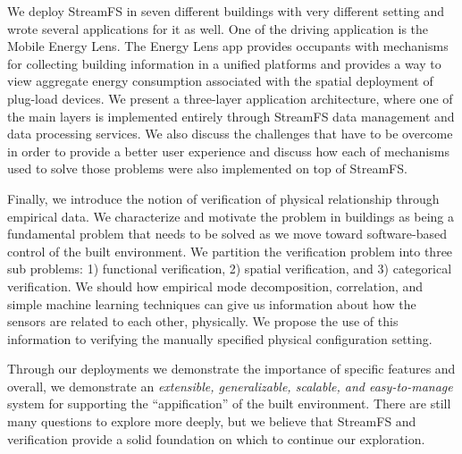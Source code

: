 We deploy StreamFS in seven different buildings with very different setting and wrote several applications for it as well.  One of the driving
application is the Mobile Energy Lens.  The Energy Lens app provides occupants with mechanisms for collecting building information
in a unified platforms and provides a way to view aggregate energy consumption associated with the spatial deployment
of plug-load devices.  We present a three-layer application architecture, where one of the main layers is implemented entirely through
StreamFS data management and data processing services.  We also discuss the challenges that have to be overcome in order to
provide a better user experience and discuss how each of mechanisms used to solve those problems were also implemented on top of StreamFS.

Finally, we introduce the notion of verification of physical relationship through empirical data.  We characterize and motivate the problem
in buildings as being a fundamental problem that needs to be solved as we move toward software-based control of the built environment.
We partition the verification problem into three sub problems: 1) functional verification, 2) spatial verification, and 3) categorical
verification.  We should how empirical mode decomposition, correlation, and simple machine learning techniques can give us 
information about how the sensors are related to each other, physically.  We propose the use of this information to 
verifying the manually specified physical configuration setting.

Through our deployments we demonstrate the importance of specific features and overall, we demonstrate an \emph{extensible, generalizable,
scalable, and easy-to-manage} system for supporting the ``appification'' of the built environment.  There are still many
questions to explore more deeply, but we believe that StreamFS and verification provide a solid foundation on which to continue
our exploration.



